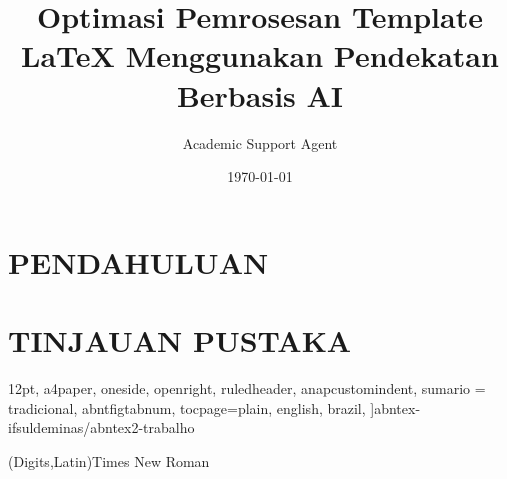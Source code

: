 \documentclass{abntex-ifsuldeminas/abntex2-trabalho}
\title{Optimasi Pemrosesan Template LaTeX Menggunakan Pendekatan Berbasis AI}
\author{Academic Support Agent}
\date{\today}
\begin{document}
\maketitle

\begin{abstract}

\end{abstract}

\chapter{PENDAHULUAN}


\chapter{TINJAUAN PUSTAKA}


    12pt,				%
    a4paper,            %
    oneside,			%
    openright,			%
    ruledheader,
    anapcustomindent,
    sumario = tradicional,
    abntfigtabnum,
    tocpage=plain,
    english,			%
	brazil,				%
    ]{abntex-ifsuldeminas/abntex2-trabalho} %


\usepackage{abntex-ifsuldeminas/abntex-ifsuldeminas} %
\usepackage{amsmath}
\usepackage{mathspec}
\setmainfont[Ligatures=TeX]{Times New Roman} %
\setsansfont[Ligatures=TeX]{Times New Roman}
\setmonofont{Times New Roman}
\setmathfont(Digits,Latin){Times New Roman} %

\usepackage{indentfirst}		            %
\usepackage{microtype} 			            %
\usepackage{fancyhdr}
\usepackage{hyperref}
\usepackage{gensymb}
\usepackage{lipsum}				%
\end{document}
